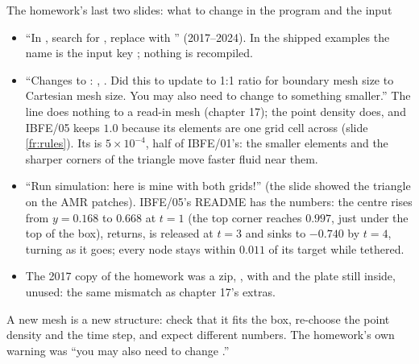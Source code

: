 \documentclass[aspectratio=169,11pt]{beamer}
\begin{document}
\begin{frame}{The homework's last two slides: what to change in the program and the input}
\label{fr:homeworkchanges}
\footnotesize
\begin{itemize}
  \item ``In , search for , replace with '' (2017--2024). In the shipped examples the name is the input key ; nothing is recompiled.
  \item ``Changes to : , . Did this to update to 1:1 ratio for boundary mesh size to Cartesian mesh size. You may also need to change  to something smaller.'' The  line does nothing to a read-in mesh (chapter 17); the point density does, and IBFE/05 keeps $1.0$ because its elements are one grid cell across (slide \ref{fr:rules}). Its  is $5\times10^{-4}$, half of IBFE/01's: the smaller elements and the sharper corners of the triangle move faster fluid near them.
  \item ``Run simulation: here is mine with both grids!'' (the slide showed the triangle on the AMR patches). IBFE/05's README has the numbers: the centre rises from $y = 0.168$ to $0.668$ at $t = 1$ (the top corner reaches $0.997$, just under the top of the box), returns, is released at $t = 3$ and sinks to $-0.740$ by $t = 4$, turning as it goes; every node stays within $0.011$ of its target while tethered.
  \item The 2017 copy of the homework was a zip, , with  and the  plate still inside, unused: the same mismatch as chapter 17's extras.
\end{itemize}
\begin{punchbox}
\footnotesize A new mesh is a new structure: check that it fits the box, re-choose the point density and the time step, and expect different numbers. The homework's own warning was ``you may also need to change .''
\end{punchbox}
\end{frame}
\end{document}
